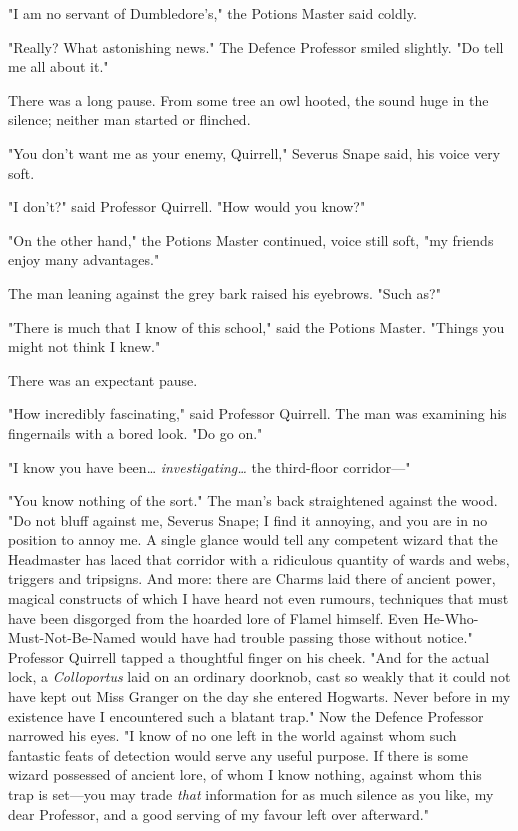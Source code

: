 "I am no servant of Dumbledore's," the Potions Master said coldly.

"Really? What astonishing news." The Defence Professor smiled slightly. "Do
tell me all about it."

There was a long pause. From some tree an owl hooted, the sound huge in the
silence; neither man started or flinched.

"You don't want me as your enemy, Quirrell," Severus Snape said, his voice very
soft.

"I don't?" said Professor Quirrell. "How would you know?"

"On the other hand," the Potions Master continued, voice still soft, "my
friends enjoy many advantages."

The man leaning against the grey bark raised his eyebrows. "Such as?"

"There is much that I know of this school," said the Potions Master. "Things
you might not think I knew."

There was an expectant pause.

"How incredibly fascinating," said Professor Quirrell. The man was examining
his fingernails with a bored look. "Do go on."

"I know you have been{\ldots} \emph{investigating{\ldots}} the third-floor
corridor---"

"You know nothing of the sort." The man's back straightened against the wood.
"Do not bluff against me, Severus Snape; I find it annoying, and you are in no
position to annoy me. A single glance would tell any competent wizard that the
Headmaster has laced that corridor with a ridiculous quantity of wards and
webs, triggers and tripsigns. And more: there are Charms laid there of ancient
power, magical constructs of which I have heard not even rumours, techniques
that must have been disgorged from the hoarded lore of Flamel himself. Even
He-Who-Must-Not-Be-Named would have had trouble passing those without notice."
Professor Quirrell tapped a thoughtful finger on his cheek. "And for the actual
lock, a \emph{Colloportus} laid on an ordinary doorknob, cast so weakly that it
could not have kept out Miss Granger on the day she entered Hogwarts. Never
before in my existence have I encountered such a blatant trap." Now the Defence
Professor narrowed his eyes. "I know of no one left in the world against whom
such fantastic feats of detection would serve any useful purpose. If there is
some wizard possessed of ancient lore, of whom I know nothing, against whom
this trap is set---you may trade \emph{that} information for as much silence as
you like, my dear Professor, and a good serving of my favour left over
afterward."

